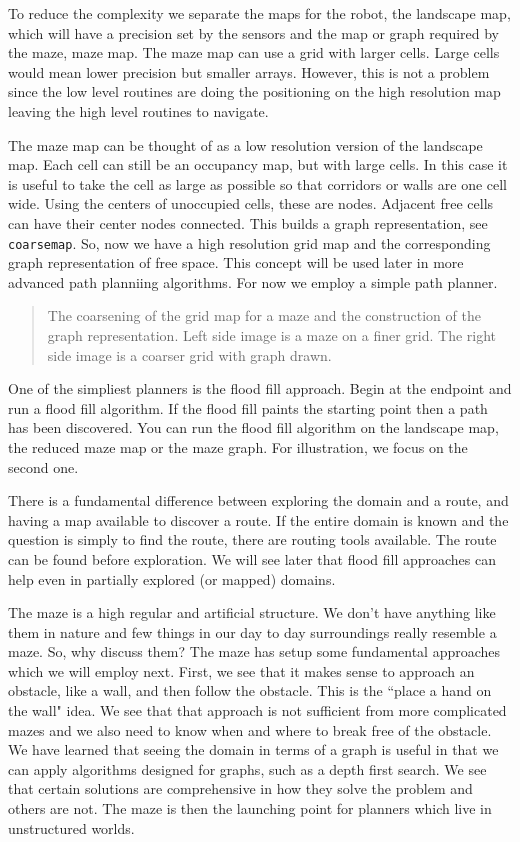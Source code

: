 To reduce the complexity we separate the maps for the robot, the
landscape map, which will have a precision set by the sensors and the
map or graph required by the maze, maze map. The maze map can use a grid
with larger cells. Large cells would mean lower precision but smaller
arrays. However, this is not a problem since the low level routines are
doing the positioning on the high resolution map leaving the high level
routines to navigate.

The maze map can be thought of as a low resolution version of the
landscape map. Each cell can still be an occupancy map, but with large
cells. In this case it is useful to take the cell as large as possible
so that corridors or walls are one cell wide. Using the centers of
unoccupied cells, these are nodes. Adjacent free cells can have their
center nodes connected. This builds a graph representation, see
\texttt{coarsemap}. So, now we have a high resolution grid map and the
corresponding graph representation of free space. This concept will be
used later in more advanced path planniing algorithms. For now we employ
a simple path planner.

\begin{quote}
The coarsening of the grid map for a maze and the construction of the
graph representation. Left side image is a maze on a finer grid. The
right side image is a coarser grid with graph drawn.
\end{quote}

One of the simpliest planners is the flood fill approach. Begin at the
endpoint and run a flood fill algorithm. If the flood fill paints the
starting point then a path has been discovered. You can run the flood
fill algorithm on the landscape map, the reduced maze map or the maze
graph. For illustration, we focus on the second one.

There is a fundamental difference between exploring the domain and a
route, and having a map available to discover a route. If the entire
domain is known and the question is simply to find the route, there are
routing tools available. The route can be found before exploration. We
will see later that flood fill approaches can help even in partially
explored (or mapped) domains.

The maze is a high regular and artificial structure. We don't have
anything like them in nature and few things in our day to day
surroundings really resemble a maze. So, why discuss them? The maze has
setup some fundamental approaches which we will employ next. First, we
see that it makes sense to approach an obstacle, like a wall, and then
follow the obstacle. This is the ``place a hand on the wall" idea. We
see that that approach is not sufficient from more complicated mazes and
we also need to know when and where to break free of the obstacle. We
have learned that seeing the domain in terms of a graph is useful in
that we can apply algorithms designed for graphs, such as a depth first
search. We see that certain solutions are comprehensive in how they
solve the problem and others are not. The maze is then the launching
point for planners which live in unstructured worlds.
